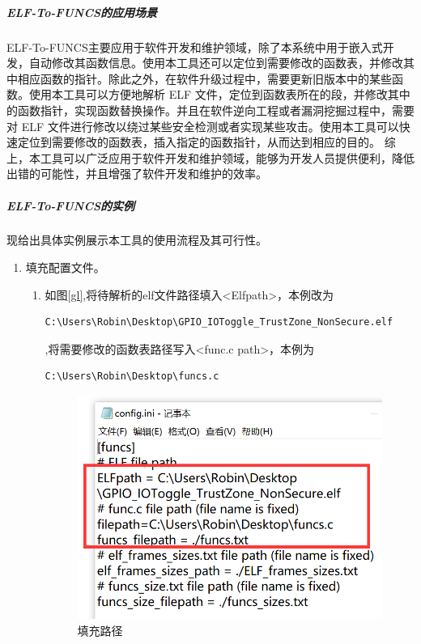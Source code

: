 \documentclass[UTF8,12pt,a4paper]{ctexart}
\numberwithin{figure}{section}
\begin{document}
\subparagraph{ELF-To-FUNCS的应用场景}
\par ELF-To-FUNCS主要应用于软件开发和维护领域，除了本系统中用于嵌入式开发，自动修改其函数信息。使用本工具还可以定位到需要修改的函数表，并修改其中相应函数的指针。除此之外，在软件升级过程中，需要更新旧版本中的某些函数。使用本工具可以方便地解析 ELF 文件，定位到函数表所在的段，并修改其中的函数指针，实现函数替换操作。并且在软件逆向工程或者漏洞挖掘过程中，需要对 ELF 文件进行修改以绕过某些安全检测或者实现某些攻击。使用本工具可以快速定位到需要修改的函数表，插入指定的函数指针，从而达到相应的目的。
综上，本工具可以广泛应用于软件开发和维护领域，能够为开发人员提供便利，降低出错的可能性，并且增强了软件开发和维护的效率。
\subparagraph{ELF-To-FUNCS的实例}
\par 现给出具体实例展示本工具的使用流程及其可行性。
\begin{enumerate}
    \item 填充配置文件。
          \begin{enumerate}
              \item 如图\ref{gl},将待解析的elf文件路径填入<Elfpath>，本例改为\begin{verbatim}C:\Users\Robin\Desktop\GPIO_IOToggle_TrustZone_NonSecure.elf\end{verbatim},将需要修改的函数表路径写入<func.c path>，本例为\begin{verbatim}C:\Users\Robin\Desktop\funcs.c\end{verbatim}
                    \begin{figure}
                        \centering
                        \includegraphics[scale=0.4]{graph/gailujing.png}
                        \caption{填充路径}

\end{figure}
\end{enumerate}
\end{enumerate}
\end{document}
